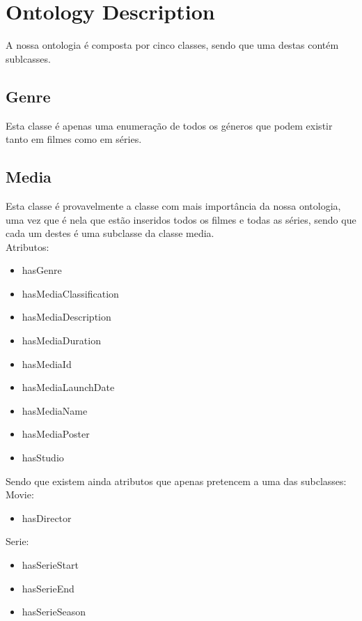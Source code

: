 \documentclass[a4paper]{article}
\begin{document}
\section{Ontology Description}
\indent \indent A nossa ontologia é composta por cinco classes, sendo que uma destas contém sublcasses.

\subsection{Genre}
\indent \indent Esta classe é apenas uma enumeração de todos os géneros que podem existir tanto em filmes como em séries.

\subsection{Media}
\indent \indent Esta classe é provavelmente a classe com mais importância da nossa ontologia, uma vez que é nela que estão inseridos todos os filmes e todas as séries, sendo que cada um destes é uma subclasse da classe media.\\
Atributos:
\begin{itemize}
	\item hasGenre
	\item hasMediaClassification
	\item hasMediaDescription
	\item hasMediaDuration
	\item hasMediaId
	\item hasMediaLaunchDate
	\item hasMediaName
	\item hasMediaPoster
	\item hasStudio
\end{itemize}

Sendo que existem ainda atributos que apenas pretencem a uma das subclasses:\\
Movie:
\begin{itemize}
	\item hasDirector
\end{itemize}
Serie:
\begin{itemize}
	\item hasSerieStart
	\item hasSerieEnd
	\item hasSerieSeason
\end{itemize}
\end{document}
